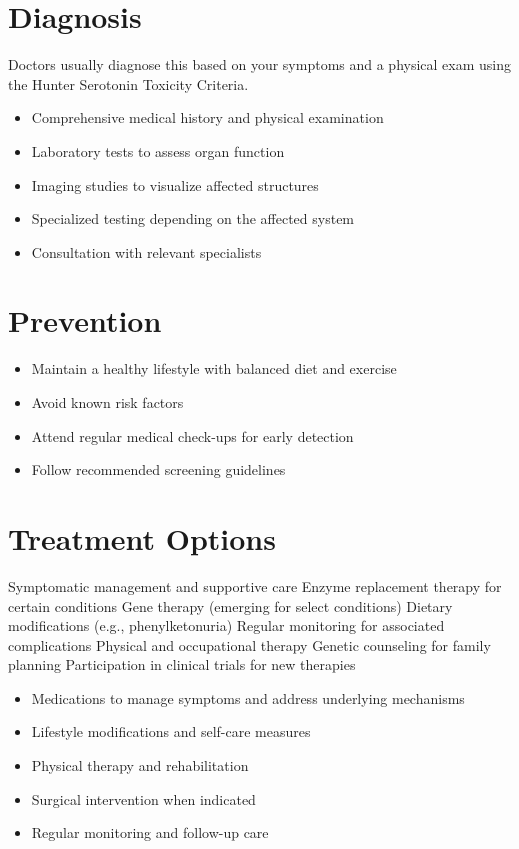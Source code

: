 \section{Diagnosis}
Doctors usually diagnose this based on your symptoms and a physical exam using the Hunter Serotonin Toxicity Criteria.

\begin{itemize}[noitemsep]
  \item Comprehensive medical history and physical examination
  \item Laboratory tests to assess organ function
  \item Imaging studies to visualize affected structures
  \item Specialized testing depending on the affected system
  \item Consultation with relevant specialists
\end{itemize}
\section{Prevention}
\begin{itemize}[noitemsep]
  \item Maintain a healthy lifestyle with balanced diet and exercise
  \item Avoid known risk factors
  \item Attend regular medical check-ups for early detection
  \item Follow recommended screening guidelines
\end{itemize}
\section{Treatment Options}
Symptomatic management and supportive care Enzyme replacement therapy for certain conditions Gene therapy (emerging for select conditions) Dietary modifications (e.g., phenylketonuria) Regular monitoring for associated complications Physical and occupational therapy Genetic counseling for family planning Participation in clinical trials for new therapies

\begin{itemize}[noitemsep]
  \item Medications to manage symptoms and address underlying mechanisms
  \item Lifestyle modifications and self-care measures
  \item Physical therapy and rehabilitation
  \item Surgical intervention when indicated
  \item Regular monitoring and follow-up care
\end{itemize}
